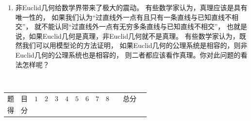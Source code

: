 \begin{enumerate}
\item 非Euclid几何给数学界带来了极大的震动。
有些数学家认为，真理应该是具有唯一性的，
如果我们认为``过直线外一点有且只有一条直线与已知直线不相交''，
就不能认同``过直线外一点有无穷多条直线与已知直线不相交''，
也就是说，如果Euclid几何是真理，非Euclid几何就不是真理。
有些数学家认为，既然我们可以用模型论的方法证明，
如果Euclid几何的公理系统是相容的，则非Euclid几何的公理系统也是相容的，
则二者都应该看作真理。你对此问题的看法怎样呢？
\end{enumerate}
~\\


\begin{center}


    \begin{table}
    \begin{tabular}{|c|c|c|c|}
        题\ \ 目 &\quad$1$\quad&\quad$2$\quad&\quad$3$\quad&\quad$4$\quad&\quad$5$\quad&\quad$6$\quad&\quad$7$\quad&\quad$8$\quad&\ \ 总分\ \ \\
        得\ \ 分 & & & & & & & & & 
    \end{tabular}
    \end{table}
\end{center}

